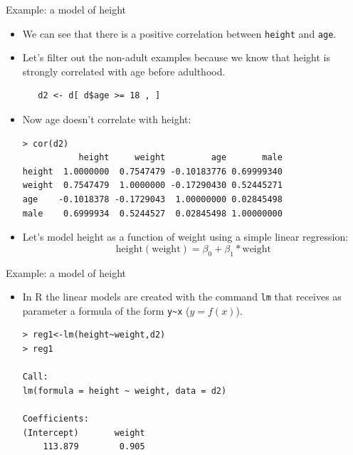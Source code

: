 \documentclass[handout]{beamer}
\begin{document}
\begin{frame}[fragile]{Example: a model of height}
\scriptsize{
\begin{itemize}
 \item We can see that there is a positive correlation between \verb+height+ and \verb+age+.
 
 \item Let's filter out the non-adult examples because we know that height is strongly correlated with age before adulthood. 
 
  \begin{verbatim}
   d2 <- d[ d$age >= 18 , ]
  \end{verbatim}

 \item Now age doesn't correlate with height:
 

  \begin{verbatim}
> cor(d2)
           height     weight         age       male
height  1.0000000  0.7547479 -0.10183776 0.69999340
weight  0.7547479  1.0000000 -0.17290430 0.52445271
age    -0.1018378 -0.1729043  1.00000000 0.02845498
male    0.6999934  0.5244527  0.02845498 1.00000000
  \end{verbatim} 
 
 
 \item Let's model height as a function of weight using a simple linear regression:
 \begin{displaymath}
  \text{height}(\text{weight})=\beta_0+\beta_1*\text{weight}
 \end{displaymath}
 

 
 

 
 


\end{itemize}
 
 
 
} 
\end{frame}

\begin{frame}[fragile]{Example: a model of height}
\scriptsize{



\begin{itemize}

  \item In R the linear models are created with the command \verb+lm+ that receives as parameter a formula of the form \verb+y~x+ ($y=f(x)$).

\begin{verbatim}
> reg1<-lm(height~weight,d2)
> reg1

Call:
lm(formula = height ~ weight, data = d2)

Coefficients:
(Intercept)       weight  
    113.879        0.905  
\end{verbatim}



 
 \end{itemize}
 
 


} 
\end{frame}
\end{document}
